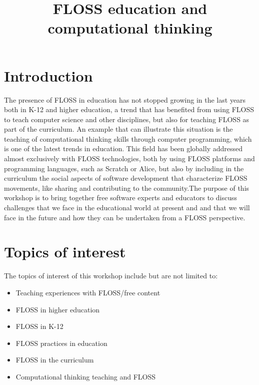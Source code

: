 \documentclass[a4paper,10pt]{article}
\title{FLOSS education and computational thinking}
\author{}
\begin{document}
\maketitle


\section*{Introduction}
The presence of FLOSS in education has not stopped growing in the last years both in K-12 and higher education, a trend that has benefited from using FLOSS to teach computer science and other disciplines, but also for teaching FLOSS as part of the curriculum. An example that can illustrate this situation is the teaching of computational thinking skills through computer programming, which is one of the latest trends in education. This field has been globally addressed almost exclusively with FLOSS technologies, both by using FLOSS platforms and programming languages, such as Scratch or Alice, but also by including in the curriculum the social aspects of software development that characterize FLOSS movements, like sharing and contributing to the community.The purpose of this workshop is to bring together free software experts and educators to discuss challenges that we face in the educational world at present and and that we will face in the future and how they can be undertaken from a FLOSS perspective.

\section*{Topics of interest}
The topics of interest of this workshop include but are not limited to:
\begin{itemize}
 \item Teaching experiences with FLOSS/free content
 \item FLOSS in higher education 
 \item FLOSS in K-12
 \item FLOSS practices in education 
 \item FLOSS in the curriculum 
 \item Computational thinking teaching and FLOSS
\end{itemize}
\end{document}
